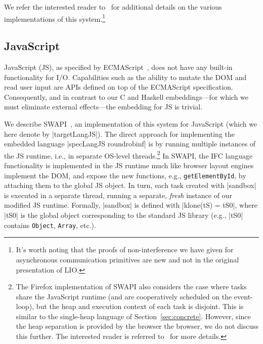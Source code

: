 We refer the interested reader to~\cite{lio,stefan:addressing-covert} for
additional details on the various implementations of this system.\footnote{It's worth noting that the proofs of non-interference we have given for asynchronous communication primitives are new and not in the original presentation of LIO.}


\subsection{JavaScript}
\label{sec:real:js}

JavaScript (JS), as specified by ECMAScript~\tocite{}, does not have any
built-in functionality for I/O. Capabilities such as the ability to
mutate the DOM and read user input are APIs defined on top of the ECMAScript
specification.
%
Consequently, and in contrast to our C and Haskell embeddings---for
which we must eliminate external effects---the embedding for JS is
trivial.

We describe SWAPI~\tocite{}, an implementation of this system for JavaScript
(which we here denote by |targetLangJS|).
%
The direct approach for implementing the embedded language |specLangJS roundrobinf| is
by running multiple instances of the JS runtime, i.e., in
separate OS-level threads.\footnote{
 The Firefox implementation of SWAPI also considers the case where
 tasks share the JavaScript runtime (and are cooperatively scheduled
 on the event-loop), but the heap and execution context of each task
 is disjoint. This is similar to the single-heap language of
 Section~\ref{sec:concrete}.  However, since the heap separation is
 provided by the browser the browser, we do not discuss this further.
 The interested reader is referred to~\tocite{} for more details.
}
%
In SWAPI, the IFC language functionality is implemented in the JS
runtime much like browser layout engines implement the DOM, and expose
the new functions, e.g., \verb|getElementById|, by attaching them to
the global JS object.
%
In turn, each task created with |sandbox| is
executed in a separate thread, running a separate, \emph{fresh} instance of our
modified JS runtime.
%
Formally, |sandbox| is defined with |klone(tS) =
tS0|, where |tS0| is the global object corresponding to the standard
JS library (e.g., |tS0| contains \texttt{Object}, \texttt{Array},
etc.).

